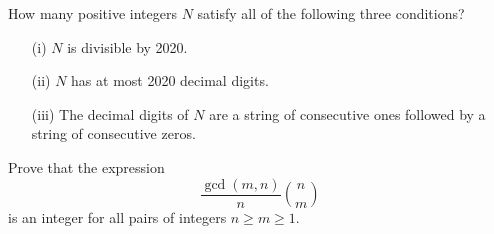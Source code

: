 \documentclass{article}
\begin{document}

\begin{exercise}[2020 A1]
    How many positive integers \(N\) satisfy all of the following three conditions?
    \begin{enumerate}
        \item[(i)] \(N\) is divisible by 2020.
        \item[(ii)] \(N\) has at most 2020 decimal digits.
        \item[(iii)] The decimal digits of \(N\) are a string of consecutive ones followed by a string of consecutive zeros.
    \end{enumerate}
\end{exercise}

\begin{exercise}[2000 Putnam B2]
    Prove that the expression
    \[\frac{\gcd(m,n)}{n}\binom{n}{m}\]
    is an integer for all pairs of integers \(n\geq m\geq 1\).
\end{exercise}
\end{document}
